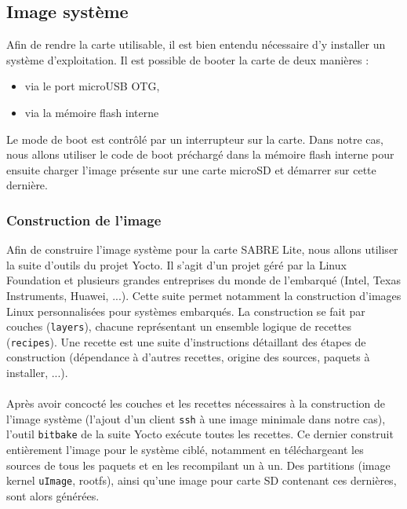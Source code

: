 \subsection{Image système}
Afin de rendre la carte utilisable, il est bien entendu nécessaire d'y installer
un système d'exploitation. Il est possible de booter la carte de deux manières :
\begin{itemize}
\renewcommand{\labelitemi}{$\bullet$}
\item via le port microUSB OTG,
\item via la mémoire flash interne
\end{itemize}
Le mode de boot est contrôlé par un interrupteur sur la carte. Dans notre cas,
nous allons utiliser le code de boot préchargé dans la mémoire flash interne
pour ensuite charger l'image présente sur une carte microSD et démarrer sur
cette dernière.

\subsubsection{Construction de l'image}
Afin de construire l'image système pour la carte SABRE Lite, nous allons
utiliser la suite d'outils du projet Yocto\cite{hallinan_create_2015}. Il s'agit
d'un projet géré par la Linux Foundation et plusieurs grandes entreprises du
monde de l'embarqué (Intel, Texas Instruments, Huawei, ...). Cette suite permet
notamment la construction d'images Linux personnalisées pour systèmes embarqués.
La construction se fait par couches (\texttt{layers}), chacune représentant un
ensemble logique de recettes (\texttt{recipes}). Une recette est une suite
d'instructions détaillant des étapes de construction (dépendance à d'autres
recettes, origine des sources, paquets à installer, ...).

\paragraph{} Après avoir concocté les couches et les recettes nécessaires à la
construction de l'image système (l'ajout d'un client \texttt{ssh} à une image
minimale dans notre cas), l'outil \texttt{bitbake}\cite{purdie_bitbake_????}
de la suite Yocto exécute toutes les recettes. Ce dernier construit entièrement
l'image pour le système ciblé, notamment en téléchargeant les sources de tous
les paquets et en les recompilant un à un. Des partitions (image kernel
\texttt{uImage}, rootfs), ainsi qu'une image pour carte SD contenant ces
dernières, sont alors générées.

